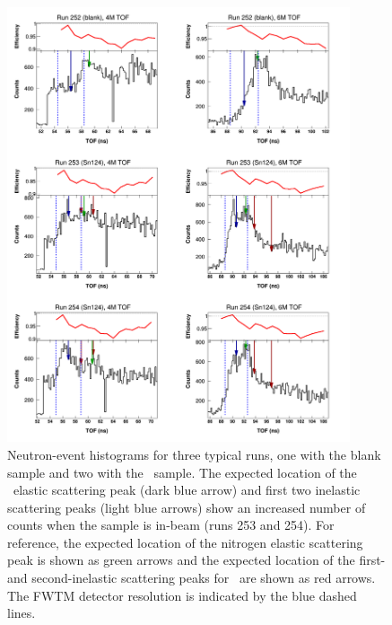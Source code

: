 \begin{figure}[ht!]
    \centering
    \includegraphics[width=0.9\textwidth]{figures/tiledRunData.png}
    \caption[Histograms from typical runs showing neutron elastic scattering peak]
    {
        Neutron-event histograms for three typical runs, one with the blank
        sample and two with the \snFour\ sample.
        The expected location of the \snFour\ elastic scattering peak (dark blue arrow)
        and first two inelastic scattering peaks (light blue arrows) show an
        increased number of counts when the sample is in-beam (runs 253 and
        254). For reference, the expected location of the nitrogen elastic scattering
        peak is shown as green arrows and the expected location of the first- and
        second-inelastic scattering peaks for \snFour\ are shown as red arrows.
        The FWTM detector resolution is indicated by the blue dashed lines.
    }
    \label{tiledRunData}
\end{figure}

